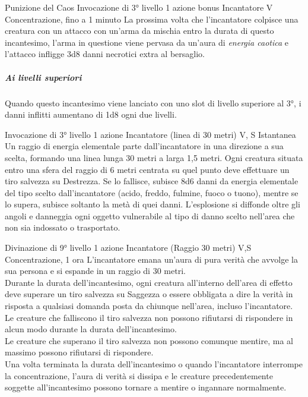 \DndSpellHeader%
  {Punizione del Caos}
  {Invocazione di 3° livello}
  {1 azione bonus}
  {Incantatore}
  {V}
  {Concentrazione, fino a 1 minuto}
La prossima volta che l'incantatore colpisce una creatura con un attacco con un'arma da mischia entro la durata di questo incantesimo, l'arma in questione viene pervasa da un'aura di \textit{energia caotica} e l'attacco infligge 3d8 danni necrotici extra al bersaglio. 
\subparagraph{Ai livelli superiori}Quando questo incantesimo viene lanciato con uno slot di livello superiore al 3°, i danni inflitti aumentano di 1d8 ogni due livelli.

{Invocazione di 3° livello}
{1 azione}
{Incantatore (linea di 30 metri)}
{V, S}
{Istantanea}
Un raggio di energia elementale parte dall'incantatore in una direzione a sua scelta, formando una linea lunga 30 metri a larga 1,5 metri. Ogni creatura situata entro una sfera del raggio di 6 metri centrata su quel punto deve effettuare un tiro salvezza su Destrezza. Se lo fallisce, subisce 8d6 danni da  energia elementale del tipo scelto dall'incantatore (acido, freddo, fulmine, fuoco o tuono), mentre se lo supera, subisce soltanto la metà di quei danni. 
L'esplosione si diffonde oltre gli angoli e danneggia ogni oggetto vulnerabile al tipo di danno scelto nell'area che non sia indossato o trasportato.

{Divinazione di 9° livello}
{1 azione}
{Incantatore (Raggio 30 metri)}
{V,S}
{Concentrazione, 1 ora}
L'incantatore emana un'aura di pura verità che avvolge la sua persona e si espande in un raggio di 30 metri. \\ Durante la durata dell'incantesimo, ogni creatura all'interno dell'area di effetto deve superare un tiro salvezza su Saggezza o essere obbligata a dire la verità in risposta a qualsiasi domanda posta da chiunque nell'area, incluso l'incantatore. \\ Le creature che falliscono il tiro salvezza non possono rifiutarsi di rispondere in alcun modo durante la durata dell'incantesimo.\\ Le creature che superano il tiro salvezza non possono comunque mentire, ma al massimo possono rifiutarsi di rispondere. \\ Una volta terminata la durata dell'incantesimo o quando l'incantatore interrompe la concentrazione, l'aura di verità si dissipa e le creature precedentemente soggette all'incantesimo possono tornare a mentire o ingannare normalmente.
